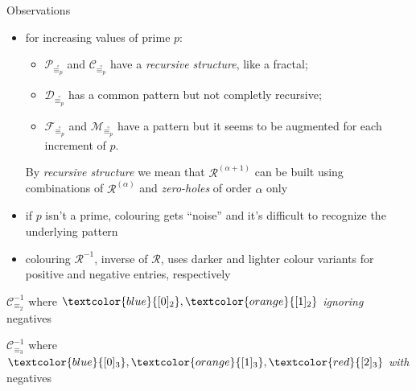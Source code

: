 \documentclass[10pt,serif, professionalfont]{beamer}
\begin{document}
\begin{frame}{Observations}
    \begin{itemize}
        \item for increasing values of prime $p$:
        \begin{itemize} 
            \item $\mathcal{P}_{\stackrel{\circ}{\equiv_{p}}}$ and
                $\mathcal{C}_{\stackrel{\circ}{\equiv_{p}}}$ have a \emph{recursive structure}, 
                like a fractal;
            \item $\mathcal{D}_{\stackrel{\circ}{\equiv_{p}}}$ has a common pattern but
                not completly recursive;
            \item $\mathcal{F}_{\stackrel{\circ}{\equiv_{p}}}$ and
                $\mathcal{M}_{\stackrel{\circ}{\equiv_{p}}}$ have a pattern but it seems
                to be augmented for each increment of $p$. 
        \end{itemize} 
        By \emph{recursive structure} we mean that $\mathcal{R}^{(\alpha+1)}$ can
        be built using combinations of  $\mathcal{R}^{(\alpha)}$ and \emph{zero-holes}
        of order $\alpha$ only

        \pause
        \item if $p$ isn't a prime, colouring gets ``noise'' and it's difficult
        to recognize the underlying pattern


        \pause
        \item colouring $\mathcal{R}^{-1}$, inverse of $\mathcal{R}$, uses darker
        and lighter colour variants for positive and negative entries, respectively
    \end{itemize} 
\end{frame}

\begin{frame}{$\mathcal{C}_{\equiv_{2}}^{-1}$ where 
    $\textcolor{blue}{[0]_{2}},\textcolor{orange}{[1]_{2}}$ \emph{ignoring} negatives}

    
\end{frame}

\begin{frame}{$\mathcal{C}_{\equiv_{3}}^{-1}$ where 
    $\textcolor{blue}{[0]_{3}},\textcolor{orange}{[1]_{3}},\textcolor{red}{[2]_{3}}$ \emph{with} negatives}

    
\end{frame}
\end{document}
